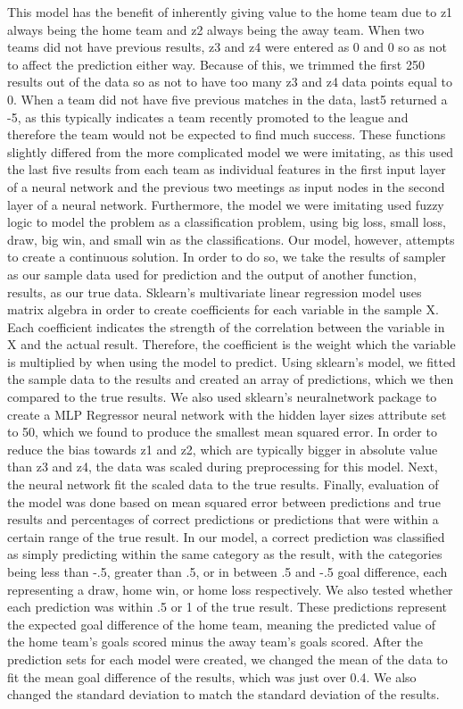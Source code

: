 \documentclass[sigconf]{acmart}
\begin{document}
This model has the benefit of inherently giving value to the home team due to z1 always being the home team and z2 always being the away team. When two teams did not have previous results, z3 and z4 were entered as 0 and 0 so as not to affect the prediction either way. Because of this, we trimmed the first 250 results out of the data so as not to have too many z3 and z4 data points equal to 0. When a team did not have five previous matches in the data, last5 returned a -5, as this typically indicates a team recently promoted to the league and therefore the team would not be expected to find much success. These functions slightly differed from the more complicated model we were imitating, as this used the last five results from each team as individual features in the first input layer of a neural network and the previous two meetings as input nodes in the second layer of a neural network. Furthermore, the model we were imitating used fuzzy logic to model the problem as a classification problem, using big loss, small loss, draw, big win, and small win as the classifications. Our model, however, attempts to create a continuous solution. In order to do so, we take the results of sampler as our sample data used for prediction and the output of another function, results, as our true data. Sklearn's multivariate linear regression model uses matrix algebra in order to create coefficients for each variable in the sample X. Each coefficient indicates the strength of the correlation between the variable in X and the actual result. Therefore, the coefficient is the weight which the variable is multiplied by when using the model to predict. Using sklearn's model, we fitted the sample data to the results and created an array of predictions, which we then compared to the true results.  We also used sklearn's neuralnetwork package to create a MLP Regressor neural network with the hidden layer sizes attribute set to 50, which we found to produce the smallest mean squared error. In order to reduce the bias towards z1 and z2, which are typically bigger in absolute value than z3 and z4, the data was scaled during preprocessing for this model. Next, the neural network fit the scaled data to the true results. Finally, evaluation of the model was done based on mean squared error between predictions and true results and percentages of correct predictions or predictions that were within a certain range of the true result. In our model, a correct prediction was classified as simply predicting within the same category as the result, with the categories being less than -.5, greater than .5, or in between .5 and -.5 goal difference, each representing a draw, home win, or home loss respectively. We also tested whether each prediction was within .5 or 1 of the true result. These predictions represent the expected goal difference of the home team, meaning the predicted value of the home team's goals scored minus the away team's goals scored. After the prediction sets for each model were created, we changed the mean of the data to fit the mean goal difference of the results, which was just over 0.4. We also changed the standard deviation to match the standard deviation of the results.
\end{document}
